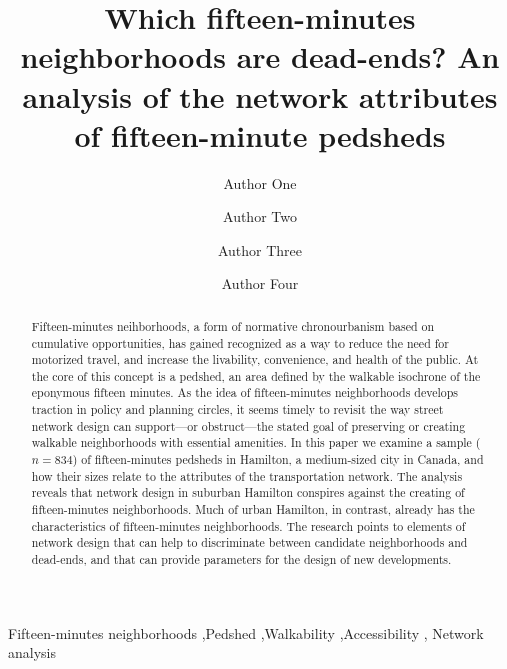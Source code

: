 \documentclass[preprint, 3p,
authoryear]{elsarticle} %
\begin{document}
\begin{frontmatter}

  \title{Which fifteen-minutes neighborhoods are dead-ends? An analysis
of the network attributes of fifteen-minute pedsheds}
    \author[University One]{Author One%
  }
    \author[University Two]{Author Two%
  }
    \author[University One]{Author Three%
  }
    \author[University One]{Author Four%
  }
  
  \begin{abstract}
  Fifteen-minutes neihborhoods, a form of normative chronourbanism based
  on cumulative opportunities, has gained recognized as a way to reduce
  the need for motorized travel, and increase the livability,
  convenience, and health of the public. At the core of this concept is
  a pedshed, an area defined by the walkable isochrone of the eponymous
  fifteen minutes. As the idea of fifteen-minutes neighborhoods develops
  traction in policy and planning circles, it seems timely to revisit
  the way street network design can support---or obstruct---the stated
  goal of preserving or creating walkable neighborhoods with essential
  amenities. In this paper we examine a sample (\(n=834\)) of
  fifteen-minutes pedsheds in Hamilton, a medium-sized city in Canada,
  and how their sizes relate to the attributes of the transportation
  network. The analysis reveals that network design in suburban Hamilton
  conspires against the creating of fifteen-minutes neighborhoods. Much
  of urban Hamilton, in contrast, already has the characteristics of
  fifteen-minutes neighborhoods. The research points to elements of
  network design that can help to discriminate between candidate
  neighborhoods and dead-ends, and that can provide parameters for the
  design of new developments.
  \end{abstract}
    \begin{keyword}
    Fifteen-minutes
neighborhoods \sep Pedshed \sep Walkability \sep Accessibility \sep 
    Network analysis
  \end{keyword}
  
 \end{frontmatter}
\end{document}
